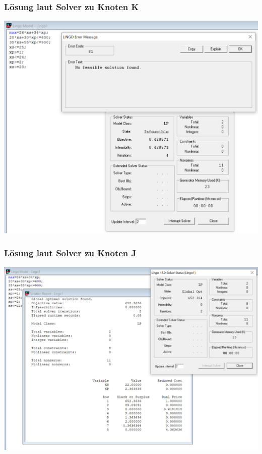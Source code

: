 \documentclass[a4paper,11pt]{article}
\begin{document}
\subsubsection*{Lösung laut Solver zu Knoten K}
\begin{centering}
	\includegraphics[width=1\linewidth]{src/blatt_5_aufgabe_2_teilaufgabe_c_knoten_k_loesung_solver.png}
\end{centering}

\subsubsection*{Lösung laut Solver zu Knoten J}
\begin{centering}
	\includegraphics[width=1\linewidth]{src/blatt_5_aufgabe_2_teilaufgabe_c_knoten_j_loesung_solver.png}
\end{centering}
\end{document}
